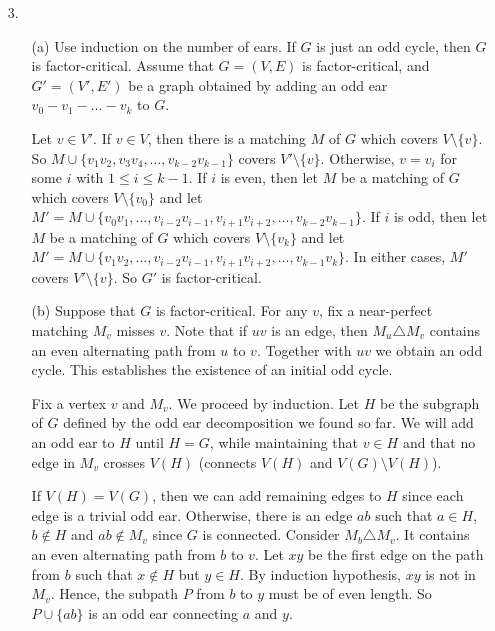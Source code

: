 \documentclass[12pt]{article}
\begin{document}
\begin{enumerate}
\begin{itemize}
\item[3.]

\begin{itemize}
\item[(a)] Use induction on the number of ears. If $G$ is just an odd cycle, then $G$ is factor-critical. Assume that $G = (V, E)$ is factor-critical, and $G' = (V', E')$ be a graph obtained by adding an odd ear $v_0-v_1-\dotsc-v_k$ to $G$.

Let $v \in V'$. If $v \in V$, then there is a matching $M$ of $G$ which covers $V \setminus \{v\}$. So $M \cup \{v_1v_2, v_3v_4, \dotsc, v_{k-2}v_{k-1}\}$ covers $V' \setminus \{v\}$. Otherwise, $v = v_i$ for some $i$ with $1\leq i \leq k-1$. If $i$ is even, then let $M$ be a matching of $G$ which covers $V \setminus \{v_0\}$ and let $M' = M \cup \{v_0v_1, \dotsc, v_{i-2}v_{i-1}, v_{i+1}v_{i+2}, \dotsc, v_{k-2}v_{k-1}\}$. If $i$ is odd, then let $M$ be a matching of $G$ which covers $V \setminus \{v_k\}$ and let $M' = M \cup \{v_1v_2,\dotsc,v_{i-2}v_{i-1},v_{i+1}v_{i+2}, \dotsc, v_{k-1}v_{k}\}$. In either cases, $M'$ covers $V' \setminus \{v\}$. So $G'$ is factor-critical.

\item[(b)] Suppose that $G$ is factor-critical. For any $v$, fix a near-perfect matching $M_v$ misses $v$. Note that if $uv$ is an edge, then $M_u \triangle M_v$ contains an even alternating path from $u$ to $v$. Together with $uv$ we obtain an odd cycle. This establishes the existence of an initial odd cycle.

Fix a vertex $v$ and $M_v$. We proceed by induction. Let $H$ be the subgraph of $G$ defined by the odd ear decomposition we found so far. We will add an odd ear to $H$ until $H = G$, while maintaining that $v \in H$ and that no edge in $M_v$ crosses $V(H)$ (connects $V(H)$ and $V(G) \setminus V(H)$).

If $V(H) = V(G)$, then we can add remaining edges to $H$ since each edge is a trivial odd ear. Otherwise, there is an edge $ab$ such that $a \in H$, $b \not\in H$ and $ab \not\in M_v$ since $G$ is connected. Consider $M_b \triangle M_v$. It contains an even alternating path from $b$ to $v$. Let $xy$ be the first edge on the path from $b$ such that $x \not \in H$ but $y \in H$. By induction hypothesis, $xy$ is not in $M_v$. Hence, the subpath $P$ from $b$ to $y$ must be of even length. So $P \cup \{ab\}$ is an odd ear connecting $a$ and $y$.


\end{itemize}


\end{itemize}
\end{enumerate}
\end{document}
